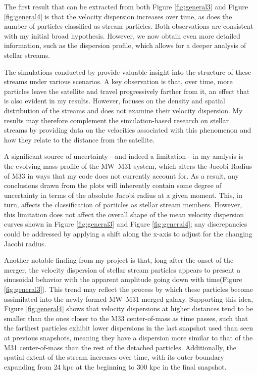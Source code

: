 \documentclass[linenumbers,trackchanges,twocolumn]{aastex7}
\begin{document}
The first result that can be extracted from both Figure \ref{fig:general3} and Figure \ref{fig:general4} is that the velocity dispersion increases over time, as does the number of particles classified as stream particles. Both observations are consistent with my initial broad hypothesis. However, we now obtain even more detailed information, such as the dispersion profile, which allows for a deeper analysis of stellar streams.

The simulations conducted by \cite{Choi2007-lc} provide valuable insight into the structure of these streams under various scenarios. A key observation is that, over time, more particles leave the satellite and travel progressively farther from it, an effect that is also evident in my results. However, \cite{Choi2007-lc} focuses on the density and spatial distribution of the streams and does not examine their velocity dispersion. My results may therefore complement the simulation-based research on stellar streams by providing data on the velocities associated with this phenomenon and how they relate to the distance from the satellite.

A significant source of uncertainty—and indeed a limitation—in my analysis is the evolving mass profile of the MW–M31 system, which alters the Jacobi Radius of M33 in ways that my code does not currently account for. As a result, any conclusions drawn from the plots will inherently contain some degree of uncertainty in terms of the absolute Jacobi radius at a given moment. This, in turn, affects the classification of particles as stellar stream members. However, this limitation does not affect the overall shape of the mean velocity dispersion curves shown in Figure \ref{fig:general3} and Figure \ref{fig:general4}; any discrepancies could be addressed by applying a shift along the x-axis to adjust for the changing Jacobi radius.

Another notable finding from my project is that, long after the onset of the merger, the velocity dispersion of stellar stream particles appears to present a sinusoidal behavior with the apparent amplitude going down with time(Figure \ref{fig:general3}). This trend may reflect the process by which these particles become assimilated into the newly formed MW–M31 merged galaxy. Supporting this idea, Figure \ref{fig:general4} shows that velocity dispersions at higher distances tend to be smaller than the ones closer to the M33 center-of-mass as time passes, such that the farthest particles exhibit lower dispersions in the last snapshot used than seen at previous snapshots, meaning they have a dispersion more similar to that of the M31 center-of-mass than the rest of the detached particles. Additionally, the spatial extent of the stream increases over time, with its outer boundary expanding from 24 kpc at the beginning to 300 kpc in the final snapshot.
\end{document}
